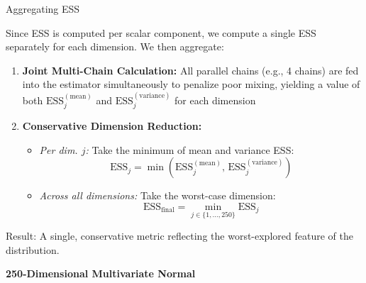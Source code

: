 \documentclass[aspectratio=43]{beamer}
\begin{document}
\begin{frame}{Aggregating ESS}
	
	Since ESS is computed per scalar component, we compute a single ESS separately for each dimension. We then aggregate:
	
	
	\begin{enumerate}
		
		\item \textbf{Joint Multi-Chain Calculation:}
		All parallel chains (e.g., 4 chains) are fed into the estimator simultaneously to penalize poor mixing, yielding a value of both $\text{ESS}_j^{(\text{mean})}$ and $\text{ESS}_j^{(\text{variance})}$ for each dimension
		
		\item \textbf{Conservative Dimension Reduction:}
		\begin{itemize}
			\item \textit{Per dim. $j$:} Take the minimum of mean and variance ESS:
			\[
			\text{ESS}_j = \min\left(\text{ESS}_j^{(\text{mean})}, \, \text{ESS}_j^{(\text{variance})}\right)
			\]
			\item \textit{Across all dimensions:} Take the worst-case dimension:
			\[
			\text{ESS}_{\text{final}} = \min_{j \in \{1, \dots, 250\}} \text{ESS}_j
			\]
		\end{itemize}
	\end{enumerate}
	
	\alert{Result:} A single, conservative metric reflecting the worst-explored feature of the distribution.
	
\end{frame}



\begin{frame}
	\begin{center}
		{\Huge \textbf{250-Dimensional Multivariate Normal}}
	\end{center}
\end{frame}
\end{document}
